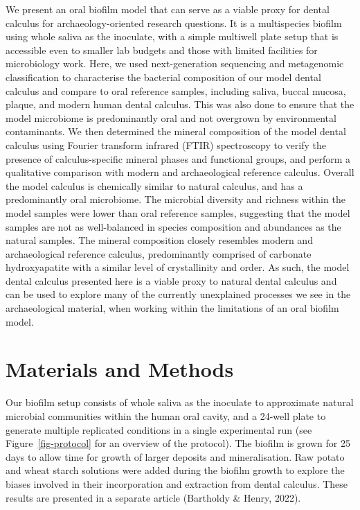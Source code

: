 \documentclass[
]{article}
\begin{document}
We present an oral biofilm model that can serve as a viable proxy for
dental calculus for archaeology-oriented research questions. It is a
multispecies biofilm using whole saliva as the inoculate, with a simple
multiwell plate setup that is accessible even to smaller lab budgets and
those with limited facilities for microbiology work. Here, we used
next-generation sequencing and metagenomic classification to
characterise the bacterial composition of our model dental calculus and
compare to oral reference samples, including saliva, buccal mucosa,
plaque, and modern human dental calculus. This was also done to ensure
that the model microbiome is predominantly oral and not overgrown by
environmental contaminants. We then determined the mineral composition
of the model dental calculus using Fourier transform infrared (FTIR)
spectroscopy to verify the presence of calculus-specific mineral phases
and functional groups, and perform a qualitative comparison with modern
and archaeological reference calculus. Overall the model calculus is
chemically similar to natural calculus, and has a predominantly oral
microbiome. The microbial diversity and richness within the model
samples were lower than oral reference samples, suggesting that the
model samples are not as well-balanced in species composition and
abundances as the natural samples. The mineral composition closely
resembles modern and archaeological reference calculus, predominantly
comprised of carbonate hydroxyapatite with a similar level of
crystallinity and order. As such, the model dental calculus presented
here is a viable proxy to natural dental calculus and can be used to
explore many of the currently unexplained processes we see in the
archaeological material, when working within the limitations of an oral
biofilm model.

\hypertarget{materials-and-methods}{%
\section{Materials and Methods}\label{materials-and-methods}}

Our biofilm setup consists of whole saliva as the inoculate to
approximate natural microbial communities within the human oral cavity,
and a 24-well plate to generate multiple replicated conditions in a
single experimental run (see Figure~\ref{fig-protocol} for an overview
of the protocol). The biofilm is grown for 25 days to allow time for
growth of larger deposits and mineralisation. Raw potato and wheat
starch solutions were added during the biofilm growth to explore the
biases involved in their incorporation and extraction from dental
calculus. These results are presented in a separate article (Bartholdy
\& Henry, 2022).
\end{document}
